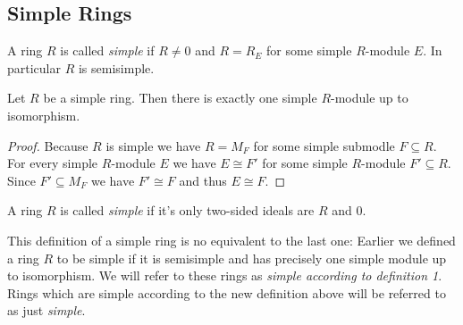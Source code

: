 




\subsection{Simple Rings}


\begin{definition}
  A ring $R$ is called \emph{simple} if $R \neq 0$ and $R = R_E$ for some simple $R$-module $E$.
  In particular $R$ is semisimple.
\end{definition}


\begin{corollary}
\label{corollary: simple rings one simple module}
  Let $R$ be a simple ring.
  Then there is exactly one simple $R$-module up to isomorphism.
\end{corollary}
\begin{proof}
  Because $R$ is simple we have $R = M_F$ for some simple submodle $F \subseteq R$.
  For every simple $R$-module $E$ we have $E \cong F'$ for some simple $R$-module $F' \subseteq R$.
  Since $F' \subseteq M_F$ we have $F' \cong F$ and thus $E \cong F$.
\end{proof}


\begin{definition}
  A ring $R$ is called \emph{simple} if it’s only two-sided ideals are $R$ and $0$.
\end{definition}


\begin{warning}
  This definition of a simple ring is no equivalent to the last one:
  Earlier we defined a ring $R$ to be simple if it is semisimple and has precisely one simple module up to isomorphism.
  We will refer to these rings as \emph{simple according to definition 1}.
  Rings which are simple according to the new definition above will be referred to as just \emph{simple}.
\end{warning}



